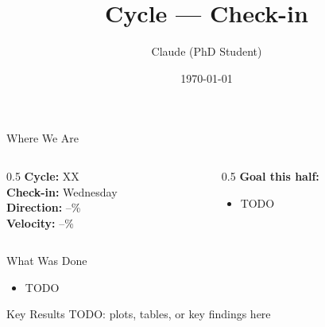 \documentclass[aspectratio=169,11pt]{beamer}
\title{Cycle \cyclenumber{} — \checkinday{} Check-in}
\subtitle{\projecttitle}
\date{\today}
\author{Claude (PhD Student)}
\institute{Supervised by: Daniel Murnane}
\newcommand{\cyclenumber}{XX}
\newcommand{\checkinday}{Wednesday}  %
\newcommand{\directionval}{--}
\newcommand{\velocityval}{--}
\begin{document}
\maketitle

\begin{frame}{Where We Are}
  \begin{columns}[T]
    \begin{column}{0.5\textwidth}
      \textbf{Cycle:} \cyclenumber \\
      \textbf{Check-in:} \checkinday \\
      \textbf{Direction:} \directionval\% \\
      \textbf{Velocity:} \velocityval\%
    \end{column}
    \begin{column}{0.5\textwidth}
      \textbf{Goal this half:} \\
      \begin{itemize}
        \item TODO
      \end{itemize}
    \end{column}
  \end{columns}
\end{frame}

\begin{frame}{What Was Done}
  \begin{itemize}
    \item TODO
  \end{itemize}
\end{frame}

\begin{frame}{Key Results}
  TODO: plots, tables, or key findings here
\end{frame}
\end{document}
